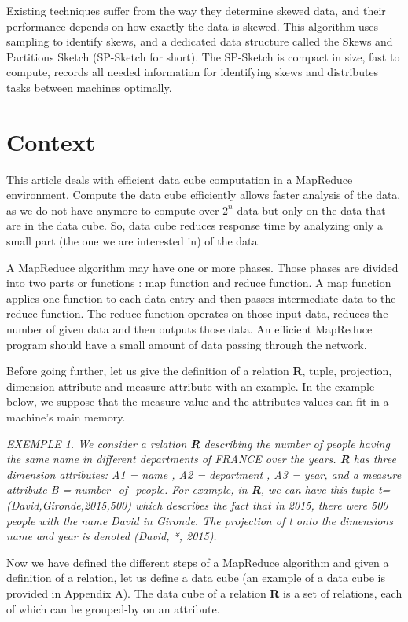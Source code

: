 \documentclass[10pt,journal,compsoc]{IEEEtran}
\begin{document}
Existing techniques suffer from the way they determine skewed data, and their performance depends on how exactly the data is skewed. This algorithm uses sampling to identify skews, and a dedicated data structure called the Skews and Partitions Sketch (SP-Sketch for short). The SP-Sketch is compact in size, fast to compute, records all needed information for identifying skews and distributes tasks between machines optimally.

\section{Context}\label{sec:context}

This article deals with efficient data cube computation in a MapReduce environment. Compute the data cube efficiently allows faster analysis of the data, as we do not have anymore to compute over ${2^n}$ data but only on the data that are in the data cube. So, data cube reduces response time by analyzing only a small part (the one we are interested in) of the data. 

A MapReduce algorithm may have one or more phases. Those phases are divided into two parts or functions : map function and reduce function. A map function applies one function to each data entry and then passes intermediate data to the reduce function. The reduce function operates on those input data, reduces the number of given data and then outputs those data. An efficient MapReduce program should have a small amount of data passing through the network.

Before going further, let us give the definition of a relation \textbf{R}, tuple, projection, dimension attribute and measure attribute with an example.
In the example below, we suppose that the measure value and the attributes values can fit in a machine's main memory.  

\textit{EXEMPLE 1. We consider a relation \textbf{R} describing the number of people having the same name in different departments of FRANCE over the years. \textbf{R} has three dimension attributes: A1 = name , A2 = department , A3 = year, and a measure attribute B  = number\_of\_people. For example, in \textbf{R}, we can have this tuple t=(David,Gironde,2015,500) which describes the fact that in 2015, there were 500 people with the name David in Gironde. The projection of t onto the dimensions name  and year is denoted (David, *, 2015).}

Now we have defined the different steps of a MapReduce algorithm and given a definition of a relation, let us define a data cube (an example of a data cube is provided in Appendix A). The data cube of a relation \textbf{R} is a set of relations, each of which can be grouped-by on an attribute. 
\end{document}
